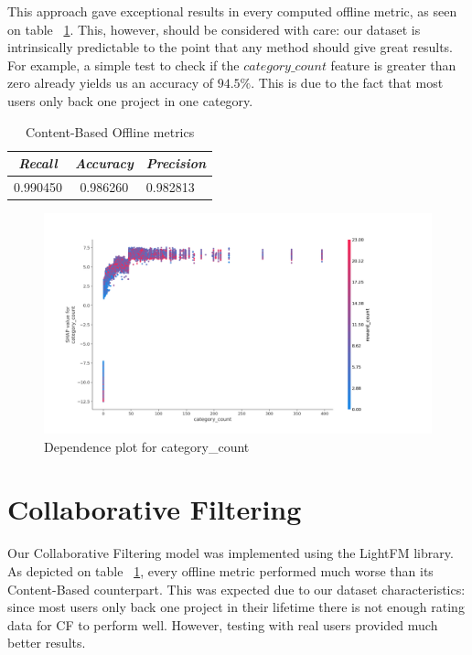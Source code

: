 \documentclass[cic,tc,english]{iiufrgs}
\begin{document}
This approach gave exceptional results in every computed offline metric, as seen on table ~\ref{tbl:cb_offline_metrics}. This, however, should be considered with care: our dataset is intrinsically predictable to the point that any method should give great results. For example, a simple test to check if the $category\_count$ feature is greater than zero already yields us an accuracy of $94.5\%$. This is due to the fact that most users only back one project in one category.

\begin{table}[h]
    \caption{Content-Based Offline metrics}
    \centering
        \begin{tabular}{c|c|p{5cm}}
          \hline
          \textit{Recall}  &   \textit{Accuracy}  &   \textit{Precision} \\
          \hline
          \hline
          0.990450           & 0.986260 &  0.982813 \\
          \hline
        \end{tabular}
    \label{tbl:cb_offline_metrics}
\end{table}

\begin{figure}
    \caption{Dependence plot for category\_count}
    \begin{center}
        \includegraphics[width=\textwidth]{category_count}
    \end{center}
    \label{fig:category_count}
\end{figure}

\section{Collaborative Filtering}
Our Collaborative Filtering model was implemented using the LightFM library. As depicted on table ~\ref{tbl:cb_offline_metrics}, every offline metric performed much worse than its Content-Based counterpart. This was expected due to our dataset characteristics: since most users only back one project in their lifetime there is not enough rating data for CF to perform well. However, testing with real users provided much better results.
\end{document}
